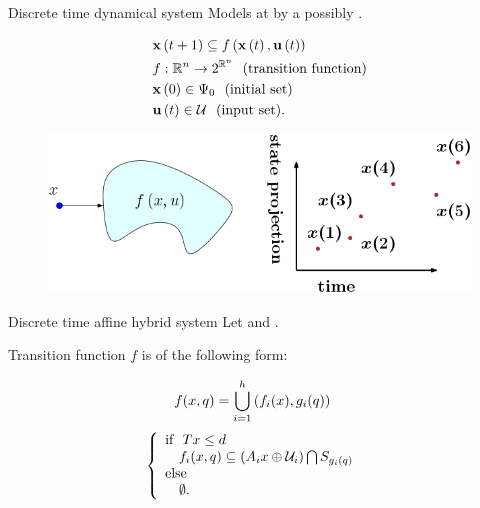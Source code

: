 \begin{frame}{Discrete time dynamical system}
Models  at  by a
possibly .
\begin{block}{}
%
{
\begin{align*}
& {\bf x}\left(t+1\right)\subseteq f\left({\bf x}\left(t\right),{\bf u}\left(t\right)\right)\\
& f:\mathbb{R}^n\rightarrow 2^{\mathbb{R}^n}~~\text{(transition function)}\\
& {\bf x}\left(0\right)\in\Psi_0~~\text{(initial set)}\\
& {\bf u}\left(t\right)\in\mathcal{U} ~~\text{(input set).}
\end{align*}
}
%
\end{block}
%
\begin{figure}
\includegraphics[scale=0.35]{figures/dynamical-system.png}
\end{figure}
%
\end{frame}

\begin{frame}{Discrete time affine hybrid system}
Let  and .

Transition function $f$ is of the following form:
%
\begin{block}{}
%
\begin{align*}
& f(x,q)=\bigcup_{i=1}^h\left(f_i(x),g_i(q)\right)
\end{align*}
\vspace{-2em}
%
{\bf
\begin{align*}
 & \left\{
\begin{array}{l}
\text{if}~~T x\leq d\\
~~~f_i(x,q) \subseteq \left(A_ix\oplus\mathcal{U}_i\right)\bigcap S_{g_i(q)}\\
\text{else}\\
~~~\emptyset.
\end{array}
\right.
\end{align*}
}
%
\end{block}
%
\end{frame}

